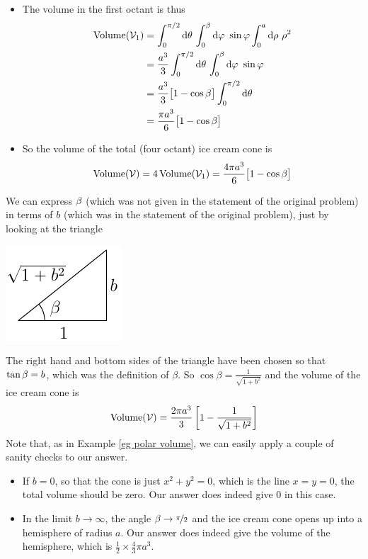 \begin{eg}
\begin{itemize}
\item
The volume in the first octant is thus
\begin{align*}
\text{Volume}(\cV_1)
&=\int_0^{\pi/2}\dee{\theta}\,\int_0^\beta \dee{\varphi}\ \sin\varphi
               \int_0^a\dee{\rho}\  \rho^2 \\
&=\frac{a^3}{3}\int_0^{\pi/2}\dee{\theta}\,
         \int_0^\beta \dee{\varphi}\ \sin\varphi \\
&=\frac{a^3}{3}\big[1-\cos\be\big]\int_0^{\pi/2}\dee{\theta} \\
&=\frac{\pi a^3}{6}\big[1-\cos\be\big]
\end{align*}
\item
So the volume of the total (four octant) ice cream cone is 
\begin{equation*}
\text{Volume}(\mathcal{V})=4\,\text{Volume}(\mathcal{V}_1)
=\frac{4\pi a^3}{6}\big[1-\cos\beta\big]
\end{equation*}
\end{itemize}
We can express $\beta$ (which was not given in the statement of the
original problem) in terms of $b$ (which was in the statement of the
original problem), just by looking at the triangle
\begin{efig}
\begin{center}
    \includegraphics{triangleIceCream.pdf}
\end{center}
\end{efig}
The right hand and bottom sides of the triangle have been chosen so that
$\tan\beta=b$, which was the definition of $\beta$. So
$\cos\beta=\frac{1}{\sqrt{1+b^2}}$ and the volume of the ice cream cone is
\begin{equation*}
\text{Volume}(\mathcal{V})
=\frac{2\pi a^3}{3}\left[1-\frac{1}{\sqrt{1+b^2}}\right]
\end{equation*}
Note that, as in Example \ref{eg polar volume}, we can easily apply a 
couple of sanity checks to our answer.
\begin{itemize}
\item 
If $b=0$, so that the cone is just $x^2+y^2=0$, which is the line $x=y=0$,
the total volume should be zero. Our answer does indeed give
$0$ in this case.
\item
In the limit $b\rightarrow\infty$, the angle $\beta\rightarrow\nicefrac{\pi}{2}$ and the ice cream cone opens up into 
a hemisphere of radius $a$. Our answer does indeed give the volume of 
the hemisphere, which is $\frac{1}{2}\times\frac{4}{3}\pi a^3$.
\end{itemize}


\end{eg}


